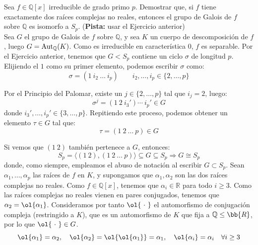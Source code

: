 \begin{ejercicio}
    Sea $f\in \mathbb{Q}[x]$ irreducible de grado primo $p$. Demostrar que, si $f$ tiene exactamente dos raíces complejas no reales, entonces el grupo de Galois de $f$ sobre $\mathbb{Q}$ es isomorfo a $S_p$.\newline
    (\textbf{Pista:} usar el Ejercicio anterior)\\

    Sea $G$ el grupo de Galois de $f$ sobre $\mathbb{Q}$, y sea $K$ un cuerpo de descomposición de $f$, luego $G=\operatorname{Aut}_\mathbb{Q}(K)$. Como es irreducible en característica $0$, $f$ es separable. Por el Ejercicio anterior, tenemos que $G<S_p$ contiene un ciclo $\sigma$ de longitud $p$. Elijiendo el $1$ como su primer elemento, podemos escribir $\sigma$ como:
    \begin{equation*}
        \sigma = (1\ i_2\ \ldots\ i_p)\qquad i_2,\ldots,i_p\in \{2,\ldots,p\}
    \end{equation*}

    Por el Principio del Palomar, existe un $j\in \{2,\ldots,p\}$ tal que $i_j = 2$, luego:
    \begin{equation*}
        \sigma^j = (1\ 2\ i_{3}')\cdots\ i_{p}' \in G
    \end{equation*}
    donde $i_{3}',\ldots,i_{p}'\in \{3,\ldots,p\}$. Repitiendo este proceso, podemos obtener un elemento $\tau\in G$ tal que:
    \begin{equation*}
        \tau =(1\ 2\ \ldots\ p) \in G
    \end{equation*}
    
    Si vemos que $(1\ 2)$ también pertenece a $G$, entonces:
    \begin{equation*}
        S_p = \langle (1\ 2), (1\ 2\ \ldots\ p) \rangle \subseteq G \subseteq S_p \Longrightarrow G \cong S_p
    \end{equation*}
    donde, como siempre, empleamos el abuso de notación al escribir $G\subset S_p$. Sean $\alpha_1,\ldots,\alpha_p$ las raíces de $f$ en $K$, y supongamos que $\alpha_1,\alpha_2$ son las dos raíces complejas no reales. Como $f\in \mathbb{Q}[x]$, tenemos que $\alpha_i\in \mathbb{R}$ para todo $i\geq 3$. Como las raíces complejas no reales vienen en pares conjugados, tenemos que $\alpha_2 = \ol{\alpha_1}$. Consideramos por tanto $\ol{\ \cdot \ }$ el automorfismo de conjugación compleja (restringido a $K$), que es un automorfismo de $K$ que fija a $\mathbb{Q}\leq \bb{R}$, por lo que $\ol{\ \cdot \ }\in G$.
    \begin{equation*}
        \ol{\alpha_1} = \alpha_2, \quad \ol{\alpha_2} = \ol{\ol{\alpha_1}} = \alpha_1, \quad \ol{\alpha_i} = \alpha_i \quad \forall i\geq 3
    \end{equation*}


\end{ejercicio}
